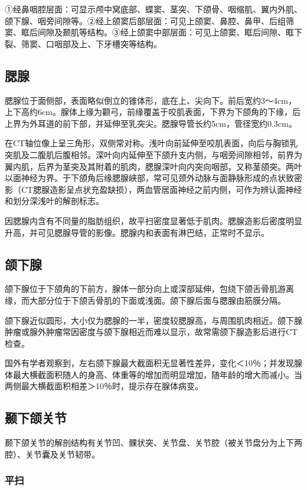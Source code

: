 ①经鼻咽腔层面：可显示颅中窝底部、蝶窦、茎突、下颌骨、咽缩肌、翼内外肌、颌下腺、咽旁间隙等。②经上颌窦后部层面：可见上颌窦、鼻腔、鼻甲、后组筛窦、眶后间隙及颞肌等结构。③经上颌窦中部层面：可见上颌窦、眶后间隙、眶下裂、筛窦、口咽部及上、下牙槽突等结构。

\subsection{腮腺}

腮腺位于面侧部，表面略似倒立的锥体形，底在上、尖向下。前后宽约3～4cm，上下高约6cm。腺体上缘为颧弓，前缘覆盖于咬肌表面，下界为下颌角的下缘，后上界为外耳道的前下部，并延伸至乳突尖。腮腺导管长约5cm，管径宽约0.3cm。

在CT轴位像上呈三角形，双侧常对称。浅叶向前延伸至咬肌表面，向后与胸锁乳突肌及二腹肌后腹相邻。深叶向内延伸至下颌升支内侧，与咽旁间隙相邻，前界为翼内肌，后界为茎突及其附着的肌肉，腮腺深叶向内突向咽部，又称茎颌突。两叶以面神经为界。于下颌角后缘腮腺峡部，常可见颈外动脉与面静脉形成的点状致密影（CT腮腺造影呈点状充盈缺损），两血管居面神经之前内侧，可作为辨认面神经和划分深浅叶的解剖标志。

因腮腺内含有不同量的脂肪组织，故平扫密度显著低于肌肉。腮腺造影后密度明显升高，并可见腮腺导管的影像。腮腺内和表面有淋巴结，正常时不显示。

\subsection{颌下腺}

颌下腺位于下颌角的下前方，腺体一部分向上或深部延伸，包绕下颌舌骨肌游离缘，而大部分位于下颌舌骨肌的下面或浅面。颌下腺后面与腮腺由筋膜分隔。

颌下腺近似圆形，大小仅为腮腺的一半，密度较腮腺高，与周围肌肉相近。颌下腺肿瘤或腺外肿瘤常因密度与颌下腺相近而难以显示，故常需颌下腺造影后进行CT检查。

国外有学者观察到，左右颌下腺最大截面积无显著性差异，变化＜10％；并发现腺体最大横截面积随人的身高、体重等的增加而明显增加，随年龄的增大而减小。当两侧最大横截面积相差＞10％时，提示存在腺体病变。

\subsection{颞下颌关节}

颞下颌关节的解剖结构有关节凹、髁状突、关节盘、关节腔（被关节盘分为上下两腔）、关节囊及关节韧带。

\subsubsection{平扫}

